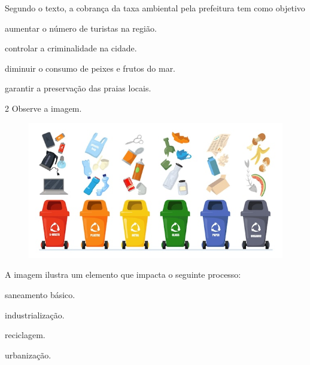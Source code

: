 Segundo o texto, a cobrança da taxa ambiental pela prefeitura tem como
objetivo

\begin{escolha}
\item aumentar o número de turistas na região.

\item controlar a criminalidade na cidade.

\item diminuir o consumo de peixes e frutos do mar.

\item garantir a preservação das praias locais.
\end{escolha}


\num{2} Observe a imagem.

\begin{figure}[htpb!]
\centering
\includegraphics[width=.5\textwidth]{./imgs/img37.jpg}
\end{figure}

A imagem ilustra um elemento que impacta o seguinte processo:

\begin{minipage}{.5\textwidth}
\begin{escolha}
\item saneamento básico.

\item industrialização.

\item reciclagem.

\item urbanização.
\end{escolha}
\end{minipage}

